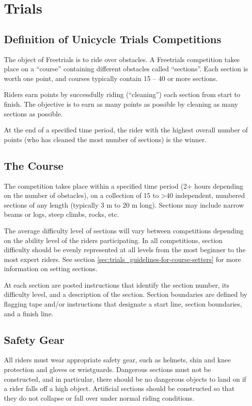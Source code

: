 \chapter*{Trials \label{chap:trials}}

\section{Definition of Unicycle Trials Competitions}
The object of Freetrials is to ride over obstacles. 
A Freetrials competition takes place on a ``course'' containing different obstacles called ``sections''. 
Each section is worth one point, and courses typically contain 15 – 40 or more sections.

Riders earn points by successfully riding (``cleaning'') each section from start to finish. 
The objective is to earn as many points as possible by cleaning as many sections as possible.

At the end of a specified time period, the rider with the highest overall number of points (who has cleaned the most number of sections) is the winner.

\section{The Course}
The competition takes place within a specified time period (2+ hours depending on the number of obstacles), on a collection of 15 to >40 independent, numbered sections of any length (typically 3 m to 20 m long). 
Sections may include narrow beams or logs, steep climbs, rocks, etc.

The average difficulty level of sections will vary between competitions depending on the ability level of the riders participating. 
In all competitions, section difficulty should be evenly represented at all levels from the most beginner to the most expert riders. 
See section \ref{sec:trials_guidelines-for-course-setters} for more information on setting sections.

At each section are posted instructions that identify the section number, its difficulty level, and a description of the section.
Section boundaries are defined by flagging tape and/or instructions that designate a start line, section boundaries, and a finish line.

\section{Safety Gear}
All riders must wear appropriate safety gear, such as helmets, shin and knee protection and gloves or wristguards.
Dangerous sections must not be constructed, and in particular, there should be no dangerous objects to land on if a rider falls off a high object. 
Artificial sections should be constructed so that they do not collapse or fall over under normal riding conditions.


